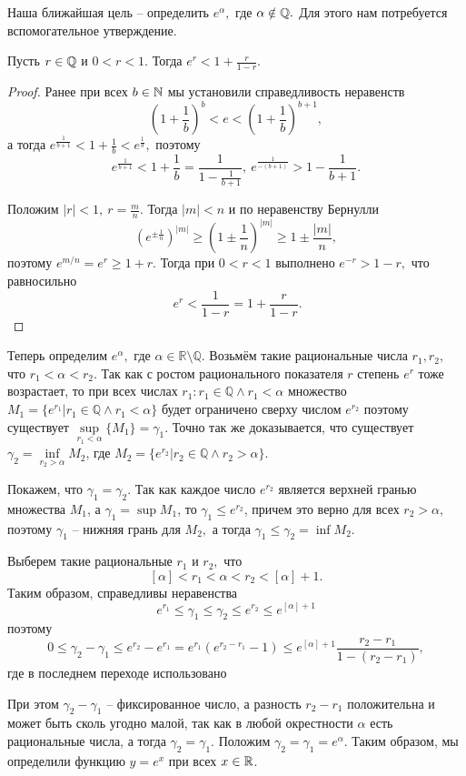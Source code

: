 Наша ближайшая цель -- определить $e^\alpha,$
где $\alpha\notin\mathbb{Q}.$ Для этого нам потребуется
вспомогательное утверждение.
\begin{proposition}
    Пусть $r\in\mathbb{Q}$ и $0 < r < 1.$ Тогда
    $e^r <1+\frac{r}{1-r}.$
\end{proposition}
\begin{proof}
    Ранее при всех $b\in \mathbb{N}$ мы установили справедливость неравенств
    $$
        \left(1+\frac{1}{b}\right)^b<e<
        \left(1+\frac{1}{b}\right)^{b+1},
    $$
    а тогда
    $
        e^{\frac{1}{b+1}} < 1 + \frac{1}{b} < e^{\frac{1}{b}},
    $
    поэтому
    $$
        e^{\frac{1}{b+1}} < 1 + \frac{1}{b} = \frac{1}
        {1 - \frac{1}{b+1}}, \ e^{\frac{1}{-(b+1)}} >
        1 - \frac{1}{b+1}.
    $$

    Положим $|r|<1, \ r = \frac{m}{n}.$
    Тогда $|m|<n$ и по неравенству Бернулли
    $$
        (e^{\pm \frac{1}{n}})^{|m|} \geq
        \left(1 \pm \frac{1}{n}\right)^{|m|} \geq
        1 \pm \frac{|m|}{n},
    $$
    поэтому $e^{m/n} = e^r \geq 1+r.$
    Тогда при
    $0 < r < 1$ выполнено $e^{-r}>1-r,$ что
    равносильно
    $$
        \ e^r <
        \frac{1}{1-r} = 1+\frac{r}{1-r}.
    $$
\end{proof}

Теперь определим $e^\alpha,$ где $\alpha \in
    \mathbb R\setminus \mathbb Q$. Возьмём такие рациональные
числа $r_1, r_2,$ что $r_1 < \alpha < r_2.$
Так как с ростом рационального показателя $r$
степень $e^r$ тоже возрастает, то при всех
числах $r_1 : r_1 \in \mathbb Q \wedge r_1
    < \alpha$ множество $M_1 = \{e^{r_1}| r_1
    \in  \mathbb Q
    \wedge r_1 < \alpha\}$
будет ограничено сверху числом $e^{r_2}$
поэтому существует
$\sup\limits_{r_1<\alpha} \{M_1\} = \gamma_1.$
Точно так же доказывается, что существует
$\gamma_2 = \inf\limits_{r_2>\alpha} M_2$,
где $M_2 = \{e^{r_2}| r_2 \in  \mathbb Q
    \wedge r_2 > \alpha\}$.

Покажем, что $\gamma_1 = \gamma_2$.
Так как каждое число $e^{r_2}$ является верхней
гранью множества $M_1$, а $\gamma_1 = \sup M_1$,
то $\gamma_1 \leq e^{r_2}$, причем это
верно для всех $r_2>\alpha,$ поэтому
$\gamma_1$ -- нижняя грань для $M_2,$
а тогда $\gamma_1 \leq \gamma_2 = \inf M_2$.

Выберем такие рациональные $r_1$ и $r_2,$ что
$$
    [\alpha] < r_1 < \alpha < r_2 < [\alpha] + 1.
$$
Таким образом, справедливы неравенства
$$
    e^{r_1} \leq \gamma_1 \leq \gamma_2
    \leq e^{r_2} \leq e^{[\alpha] + 1}
$$
поэтому
$$
    0 \leq \gamma_2 - \gamma_1 \leq e^{r_2} - e^{r_1} =
    e^{r_1}(e^{r_2 - r_1} - 1) \leq e^{[\alpha] +1}
    \frac{r_2 - r_1}{1 - (r_2 - r_1)},
$$
где в последнем переходе использовано
\begin{proposition}


    При этом $\gamma_2 - \gamma_1$ -- фиксированное число,
    а разность $r_2-r_1$ положительна
    и может быть сколь угодно малой, так как в любой
    окрестности $\alpha$ есть рациональные числа, а тогда
    $\gamma_2 = \gamma_1$.
    Положим $\gamma_2 = \gamma_1 = e^\alpha$.
    Таким образом, мы определили функцию
    $y = e^x$ при всех $x\in\mathbb{R}$.
\end{proposition}

